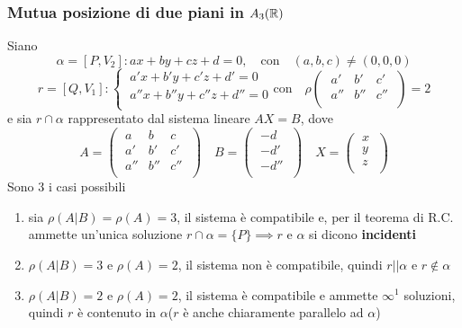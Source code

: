 \subsubsection{Mutua posizione di due piani in \(A_3(\RR )\)}
Siano \[
\alpha = [P, V_2]: ax + by + cz + d = 0, \quad \text{con}\quad (a,b,c) \neq (0,0,0) \]
\[
r=[Q, V_1]:
\begin{cases}
    \ a'x + b'y + c'z + d' = 0 \\
    \ a ''x + b ''y + c ''z + d '' = 0 \\
\end{cases} \text{con} \quad 
\rho
\left( \; \begin{matrix}
    a' & b' & c' \\
    a '' & b '' & c '' \\
\end{matrix} \; \right) = 2
\] e sia \(r \cap \alpha \) rappresentato dal sistema lineare \(AX = B\), dove \[
A =
\left( \; \begin{matrix}
    a & b & c \\
    a' & b' & c' \\
    a '' & b '' & c '' \\
\end{matrix} \; \right) \quad
B =
\left( \; \begin{matrix}
    -d \\
    -d' \\
    -d '' \\
\end{matrix} \; \right) \quad X =
\left( \; \begin{matrix}
    x \\
    y \\
    z \\
\end{matrix} \; \right) 
\] Sono 3 i casi possibili
\begin{enumerate}
    \item sia \(\rho(A|B) = \rho(A) =3\), il sistema è compatibile e, per il teorema di R.C. ammette un'unica soluzione \(r \cap \alpha  = \{P\} \implies r\) e \(\alpha \) si dicono \textbf{incidenti}
    \item \(\rho(A|B) = 3\) e \(\rho(A) =2\), il sistema non è compatibile, quindi \(r || \alpha \) e \(r \notin \alpha \) 
    \item \(\rho(A|B) = 2\) e \(\rho(A) = 2\), il sistema è compatibile e ammette \(\infty^{1}\) soluzioni, quindi \(r\) è contenuto in \(\alpha \)(\(r\) è anche chiaramente parallelo ad \(\alpha \))
\end{enumerate}

